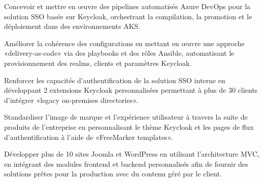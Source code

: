\documentclass[11pt]{deedy-resume-openfont}
\begin{document}
\sectionsep
{}
\sectionsep
%
%
\newpage
{}\hfill {}
\begin{tightemize}
	\item Concevoir et mettre en œuvre des pipelines automatisés Azure DevOps pour la solution SSO basée sur Keycloak, orchestrant la compilation, la promotion et le déploiement dans des environnements AKS.
	\item Améliorer la cohérence des configurations en mettant en œuvre une approche «delivery-as-code» via des playbooks et des rôles Ansible, automatisant le provisionnement des realms, clients et paramètres Keycloak.
	\item Renforcer les capacités d'authentification de la solution SSO interne en développant 2 extensions Keycloak personnalisées permettant à plus de 30 clients d'intégrer «legacy on-premises directories».
	\item Standardiser l'image de marque et l'expérience utilisateur à travers la suite de produits de l'entreprise en personnalisant le thème Keycloak et les pages de flux d'authentification à l'aide de «FreeMarker templates».
\end{tightemize}
\sectionsep
{}
\sectionsep
{}\hfill {}
\begin{tightemize}
	\item Développer plus de 10 sites Joomla et WordPress en utilisant l'architecture MVC, en intégrant des modules frontend et backend personnalisés afin de fournir des solutions prêtes pour la production avec du contenu géré par le client.
\end{tightemize}
\sectionsep
{}
%
%
\vspace{0.2cm}
\end{document}
